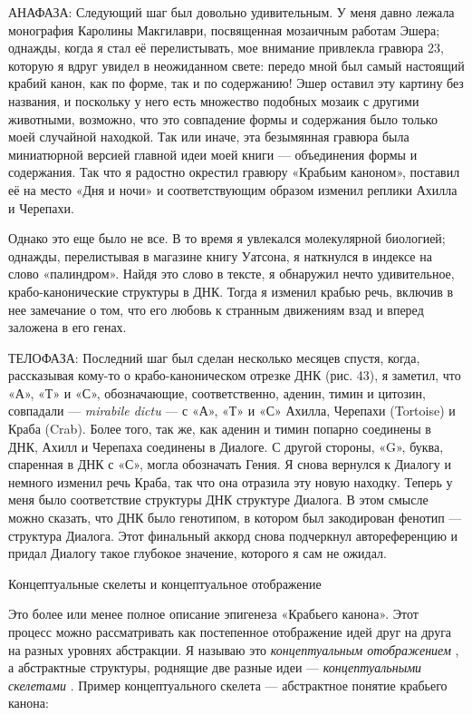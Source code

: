 \documentclass[../main.tex]{subfiles}
\begin{document}
АНАФАЗА: Следующий шаг был довольно удивительным. У меня давно лежала монография Каролины Макгилаври, посвященная мозаичным работам Эшера; однажды, когда я стал её перелистывать, мое внимание привлекла гравюра 23, которую я вдруг увидел в неожиданном свете: передо мной был самый настоящий крабий канон, как по форме, так и по содержанию! Эшер оставил эту картину без названия, и поскольку у него есть множество подобных мозаик с другими животными, возможно, что это совпадение формы и содержания было только моей случайной находкой. Так или иначе, эта безымянная гравюра была миниатюрной версией главной идеи моей книги --- объединения формы и содержания. Так что я радостно окрестил гравюру «Крабьим каноном», поставил её на место «Дня и ночи» и соответствующим образом изменил реплики Ахилла и Черепахи.

Однако это еще было не все. В то время я увлекался молекулярной биологией; однажды, перелистывая в магазине книгу Уатсона, я наткнулся в индексе на слово «палиндром». Найдя это слово в тексте, я обнаружил нечто удивительное, крабо-канонические структуры в ДНК\@. Тогда я изменил крабью речь, включив в нее замечание о том, что его любовь к странным движениям взад и вперед заложена в его генах.

ТЕЛОФАЗА: Последний шаг был сделан несколько месяцев спустя, когда, рассказывая кому-то о крабо-каноническом отрезке ДНК (рис. 43), я заметил, что «А», «Т» и «С», обозначающие, соответственно, аденин, тимин и цитозин, совпадали --- \emph{mirabile dictu} --- с «А», «Т» и «С» Ахилла, Черепахи (Tortoise) и Краба (Crab). Более того, так же, как аденин и тимин попарно соединены в ДНК, Ахилл и Черепаха соединены в Диалоге. С другой стороны, «G», буква, спаренная в ДНК с «С», могла обозначать Гения. Я снова вернулся к Диалогу и немного изменил речь Краба, так что она отразила эту новую находку. Теперь у меня было соответствие структуры ДНК структуре Диалога. В этом смысле можно сказать, что ДНК было генотипом, в котором был закодирован фенотип --- структура Диалога. Этот финальный аккорд снова подчеркнул автореференцию и придал Диалогу такое глубокое значение, которого я сам не ожидал.

Концептуальные скелеты и концептуальное отображение

Это более или менее полное описание эпигенеза «Крабьего канона». Этот процесс можно рассматривать как постепенное отображение идей друг на друга на разных уровнях абстракции. Я называю это \emph{концептуальным отображением} , а абстрактные структуры, роднящие две разные идеи --- \emph{концептуальными скелетами} . Пример концептуального скелета --- абстрактное понятие крабьего канона:
\end{document}
